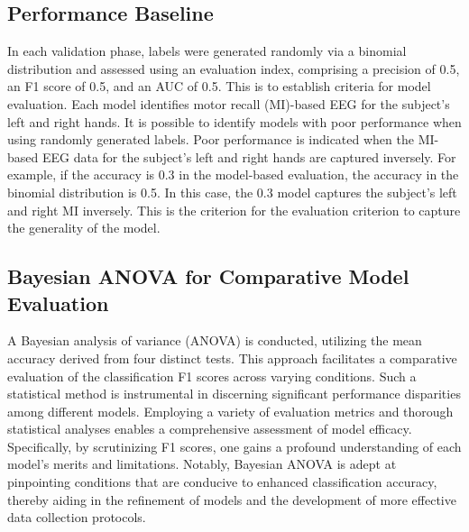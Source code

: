     \subsection{Performance Baseline}
    In each validation phase, labels were generated randomly via a binomial distribution
    and assessed using an evaluation index, comprising a precision of 0.5, an F1
    score of 0.5, and an AUC of 0.5. This is to establish criteria for model
    evaluation. Each model identifies motor recall (MI)-based 
    EEG for the subject's left and right hands. It is possible to identify
    models with poor performance when using randomly generated labels. Poor performance
    is indicated when the MI-based EEG data for the subject's left and right hands
    are captured inversely. For example, if the accuracy is 0.3 in the model-based
    evaluation, the accuracy in the binomial distribution is 0.5. In this case, the
    0.3 model captures the subject's left and right MI inversely. This is the
    criterion for the evaluation criterion to capture the generality of the
    model.
    \subsection{Bayesian ANOVA for Comparative Model Evaluation}
    A Bayesian analysis of variance (ANOVA)\cite{kruschke2010bayesian} is conducted, utilizing the mean
    accuracy derived from four distinct tests. This approach facilitates a comparative
    evaluation of the classification F1 scores across varying conditions. Such a
    statistical method is instrumental in discerning significant performance
    disparities among different models. Employing a variety of evaluation metrics
    and thorough statistical analyses enables a comprehensive assessment of model
    efficacy. Specifically, by scrutinizing F1 scores, one gains a profound
    understanding of each model's merits and limitations. Notably, Bayesian
    ANOVA is adept at pinpointing conditions that are conducive to enhanced
    classification accuracy, thereby aiding in the refinement of models and the development
    of more effective data collection protocols.


